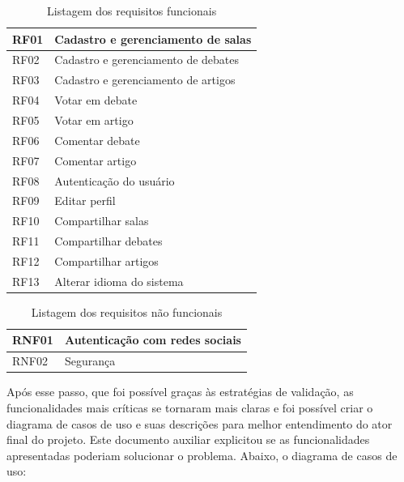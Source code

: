 \begin{table}[]
\centering
\caption{Listagem dos requisitos funcionais}
\label{my-label}
\begin{tabular}{|l|l|}
\hline
RF01 & Cadastro e gerenciamento de salas   \\ \hline
RF02 & Cadastro e gerenciamento de debates \\ \hline
RF03 & Cadastro e gerenciamento de artigos \\ \hline
RF04 & Votar em debate                     \\ \hline
RF05 & Votar em artigo                     \\ \hline
RF06 & Comentar debate                     \\ \hline
RF07 & Comentar artigo                     \\ \hline
RF08 & Autenticação do usuário             \\ \hline
RF09 & Editar perfil                       \\ \hline
RF10 & Compartilhar salas                  \\ \hline
RF11 & Compartilhar debates                \\ \hline
RF12 & Compartilhar artigos                \\ \hline
RF13 & Alterar idioma do sistema           \\ \hline
\end{tabular}
\end{table}

\begin{table}[]
\centering
\caption{Listagem dos requisitos não funcionais}
\label{my-label}
\begin{tabular}{|l|l|}
\hline
RNF01 & Autenticação com redes sociais \\ \hline
RNF02 & Segurança                      \\ \hline
\end{tabular}
\end{table}

Após esse passo, que foi possível graças às estratégias de validação, as funcionalidades mais críticas se tornaram mais claras e foi possível criar o diagrama de casos de uso e suas descrições para melhor entendimento do ator final do projeto. Este documento auxiliar explicitou se as funcionalidades apresentadas poderiam solucionar o problema. Abaixo, o diagrama de casos de uso:

\newpage

